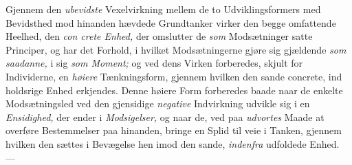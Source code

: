 Gjennem den \emph{ubevidste} Vexelvirkning mellem de to
Udviklingsformers med Bevidsthed mod hinanden hævdede
Grundtanker virker den begge omfattende Heelhed, den \emph{con\-%
crete Enhed,} der omslutter de \emph{som} Modsætninger satte
Principer, og har det Forhold, i hvilket Modsætningerne gjøre
sig gjældende \emph{som saadanne,} i sig \emph{som Moment;} og ved
dens Virken forberedes, skjult for Individerne, en \emph{høiere}
Tænkningsform, gjennem hvilken den sande concrete, ind\-%
holdsrige Enhed erkjendes. Denne høiere Form forberedes
baade naar de enkelte Modsætningsled ved den gjensidige
\emph{negative} Indvirkning udvikle sig i en \emph{Ensidighed,} der
ender i \emph{Modsigelser,} og naar de, ved paa \emph{udvortes} Maade
at overføre Bestemmelser paa hinanden, bringe en Splid til\-%
veie i Tanken, gjennem hvilken den sættes i Bevægelse hen\-%
imod den sande, \emph{indenfra} udfoldede Enhed. ---

